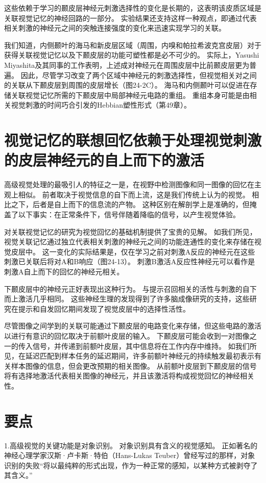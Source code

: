 这些依赖于学习的颞皮层神经元刺激选择性的变化是长期的，这表明该皮质区域是关联视觉记忆的神经回路的一部分。 实验结果还支持这样一种观点，即通过代表相关刺激的神经元之间的突触连接强度的变化来迅速实现学习的关联。

我们知道，内侧颞叶的海马和新皮层区域（周围，内嗅和帕拉希波克宫皮层）对于获得关联视觉记忆以及下颞皮层的功能可塑性都是必不可少的。 实际上，Yasushi Miyashita及其同事的工作表明，上述成对神经元在周围皮层中比前颞皮层更为普遍。 因此，尽管学习改变了两个区域中神经元的刺激选择性，但视觉相关对之间的关联从下颞皮层到周围的皮层增长（图24-2C）。 海马和内侧颞叶可以促进在存储关联视觉记忆所需的下颞皮层中局部神经元电路的重组。 重组本身可能是由相关视觉刺激的时间巧合引发的Hebbian塑性形式（第49章）。


\section{视觉记忆的联想回忆依赖于处理视觉刺激的皮层神经元的自上而下的激活}

高级视觉处理的最吸引人的特征之一是，在视野中检测图像和同一图像的回忆在主观上相似。 前者取决于视觉信息的自下而上流，这是我们传统上认为的视觉。 相比之下，后者是自上而下的信息流的产物。 这种区别在解剖学上是准确的，但掩盖了以下事实：在正常条件下，信号伴随着降临的信号，以产生视觉体验。

对关联视觉记忆的研究为视觉回忆的基础机制提供了宝贵的见解。 如我们所见，视觉关联记忆通过独立代表相关刺激的神经元之间的功能连通性的变化来存储在视觉皮层中。 这一变化的实际结果是，仅在学习之前对刺激A反应的神经元在这些刺激已关联后将对A和B响应（图24-13）。 刺激B激活A反应性神经元可以看作是刺激A自上而下的回忆的神经元相关。

下颞皮层中的神经元正好表现出这种行为。 与提示召回相关的活性与刺激的自下而上激活几乎相同。 这些神经生理的发现得到了许多脑成像研究的支持，这些研究在提示和自发回忆期间发现了视觉皮层中的选择性活性。

尽管图像之间学到的关联可能通过下颞皮层的电路变化来存储，但这些电路的激活以进行有意识的回忆取决于前额叶皮层的输入。 下颞皮层可能会收到一对图像之一的传入信号，并传递到前额叶皮层，其中信息将在工作内存中维持。 如我们所见，在延迟匹配到样本任务的延迟期间，许多前额叶神经元的持续触发最初表示有关样本图像的信息，但会更改预期的相关图像。 从前额叶皮层到下颞皮层的信号将有选择地激活代表相关图像的神经元，并且该激活将构成视觉回忆的神经相关性。

\section{要点}
1.高级视觉的关键功能是对象识别。 对象识别具有含义的视觉感知。 正如著名的神经心理学家汉斯·卢卡斯·特伯（Hans-Lukas Teuber）曾经写过的那样，对象识别的失败“将以最纯粹的形式出现，作为一种正常的感知，以某种方式被剥夺了其含义。” 

